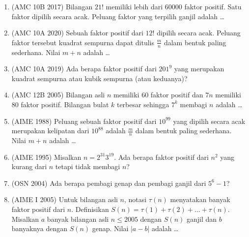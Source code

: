 \documentclass[12pt]{scrartcl}
\begin{document}
\begin{enumerate}
	\item (AMC 10B 2017)
	Bilangan $21!$ memiliki lebih dari $60000$ faktor positif.
	Satu faktor dipilih secara acak.
	Peluang faktor yang terpilih ganjil adalah \dots

	\item (AMC 10A 2020)
	Sebuah faktor positif dari $12!$ dipilih secara acak.
	Peluang faktor tersebut kuadrat sempurna dapat ditulis $\frac{m}{n}$
	dalam bentuk paling sederhana. Nilai $m + n$ adalah \dots

	\item (AMC 10A 2019)
	Ada berapa faktor positif dari $201^{9}$ yang merupakan kuadrat sempurna
	atau kubik sempurna (atau keduanya)?

	\item (AMC 12B 2005)
	Bilangan asli $n$ memiliki $60$ faktor positif dan $7n$ memiliki
	$80$ faktor positif. Bilangan bulat $k$ terbesar sehingga $7^{k}$
	membagi $n$ adalah \dots

	\item (AIME 1988)
	Peluang sebuah faktor positif dari $10^{99}$ yang dipilih secara acak
	merupakan kelipatan dari $10^{88}$ adalah $\frac{m}{n}$ dalam bentuk
	paling sederhana. Nilai $m + n$ adalah \dots

	\item (AIME 1995)
	Misalkan $n = 2^{31}3^{19}$. Ada berapa faktor positif dari $n^2$
	yang kurang dari $n$ tetapi tidak membagi $n$?

	\item (OSN 2004)
	Ada berapa pembagi genap dan pembagi ganjil dari $5^{6} - 1$?

	\item (AIME I 2005)
	Untuk bilangan asli $n$, notasi $\tau(n)$ menyatakan banyak faktor positif
	dari $n$. Definisikan $S(n) = \tau(1) + \tau(2) + \dots + \tau(n)$.
	Misalkan $a$ banyak bilangan asli $n \le 2005$ dengan $S(n)$ ganjil
	dan $b$ banyaknya dengan $S(n)$ genap. Nilai $|a - b|$ adalah \dots


\end{enumerate}
\end{document}
